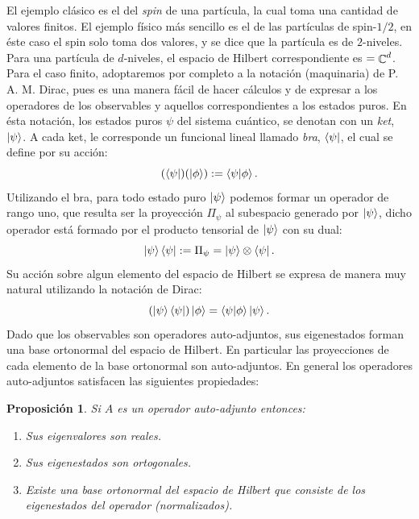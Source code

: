 \documentclass[a4paper,11pt]{report}
\DeclareMathOperator{\C}{\mathbb{C}}
\let\H\relax
\DeclareMathOperator{\H}{\mathcal H}
\newtheorem{proposition}{Proposición}
\begin{document}
  El ejemplo clásico es el del \textit{spin} de una
  partícula, la cual toma una cantidad de valores finitos.
  El ejemplo físico más sencillo es el de las partículas de
  spin-$1/2$, en éste caso el spin solo toma dos
  valores, y se dice que la partícula es de $2$-niveles.
  Para una partícula de $d$-niveles, el espacio de Hilbert
  correspondiente es $\H  = \C^{d}$. Para el caso finito,
  adoptaremos por completo a la notación (maquinaria) de P.
  A. M. Dirac, pues es una manera fácil de hacer cálculos y
  de expresar a los operadores de los observables y aquellos
  correspondientes a los estados puros. En ésta notación,
  los estados puros $\psi$ del sistema cuántico, se denotan
  con un \textit{ket}, $\ket \psi$. A cada ket, le
  corresponde un funcional lineal llamado \textit{bra},
  $\bra \psi$, el cual se define por su acción:
  \[
    (\bra \psi)(\ket{\phi})
    := \braket{\psi|\phi}.
  \] 
  Utilizando el bra, para todo estado puro $\ket{\psi}$
  podemos formar un operador de rango uno, que resulta ser
  la proyección $\Pi_\psi$ al subespacio generado por
  $\ket{\psi}$, dicho operador está formado por el producto
  tensorial de $\ket{\psi}$ con su dual:
  \begin{equation}
    \ket \psi \bra \psi
    := \Pi_\psi
    = \ket \psi \otimes \bra \psi.
  \end{equation} 
  Su acción sobre algun elemento del espacio de Hilbert se
  expresa de manera muy natural utilizando la notación de
  Dirac:
  \[
    \left(\ket \psi \bra \psi\right) \ket \phi
    = \braket{\psi|\phi} \ket \psi.
  \] 
  Dado que los observables son operadores auto-adjuntos, sus
  eigenestados forman una base ortonormal del espacio de
  Hilbert. En particular las proyecciones de cada elemento
  de la base ortonormal son auto-adjuntos. En general los
  operadores auto-adjuntos satisfacen las siguientes
  propiedades:
  \begin{proposition}
    Si $A$ es un operador auto-adjunto entonces:
    \begin{enumerate}
      \item Sus eigenvalores son reales.
      \item Sus eigenestados son ortogonales.
      \item Existe una base ortonormal del espacio de
        Hilbert que consiste de los eigenestados del
        operador (normalizados).
    \end{enumerate}
  \end{proposition}
\end{document}
